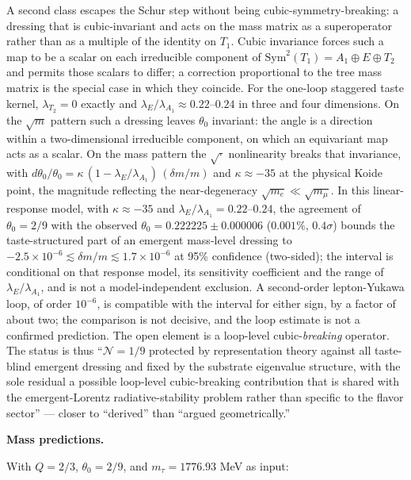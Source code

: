 \documentclass[
]{article}
\begin{document}
A second class escapes the Schur step without being
cubic-symmetry-breaking: a dressing that is cubic-invariant and acts on
the mass matrix as a superoperator rather than as a multiple of the
identity on \(T_1\). Cubic invariance forces such a map to be a scalar
on each irreducible component of
\(\mathrm{Sym}^2(T_1) = A_1 \oplus E \oplus T_2\) and permits those
scalars to differ; a correction proportional to the tree mass matrix is
the special case in which they coincide. For the one-loop staggered
taste kernel, \(\lambda_{T_2} = 0\) exactly and
\(\lambda_E/\lambda_{A_1} \approx 0.22\)--\(0.24\) in three and four
dimensions. On the \(\sqrt{m}\) pattern such a dressing leaves
\(\theta_0\) invariant: the angle is a direction within a
two-dimensional irreducible component, on which an equivariant map acts
as a scalar. On the mass pattern the \(\sqrt{\cdot}\) nonlinearity
breaks that invariance, with
\(d\theta_0/\theta_0 = \kappa\,(1 - \lambda_E/\lambda_{A_1})\,(\delta m/m)\)
and \(\kappa \approx -35\) at the physical Koide point, the magnitude
reflecting the near-degeneracy \(\sqrt{m_e} \ll \sqrt{m_\mu}\). In this
linear-response model, with \(\kappa \approx -35\) and
\(\lambda_E/\lambda_{A_1} = 0.22\)--\(0.24\), the agreement of
\(\theta_0 = 2/9\) with the observed
\(\theta_0 = 0.222225 \pm 0.000006\) (\(0.001\%\), \(0.4\sigma\)) bounds
the taste-structured part of an emergent mass-level dressing to
\(-2.5 \times 10^{-6} \lesssim \delta m/m \lesssim 1.7 \times 10^{-6}\)
at 95\% confidence (two-sided); the interval is conditional on that
response model, its sensitivity coefficient and the range of
\(\lambda_E/\lambda_{A_1}\), and is not a model-independent exclusion. A
second-order lepton-Yukawa loop, of order \(10^{-6}\), is compatible
with the interval for either sign, by a factor of about two; the
comparison is not decisive, and the loop estimate is not a confirmed
prediction. The open element is a loop-level cubic-\emph{breaking}
operator. The status is thus ``\(\mathcal{N} = 1/9\) protected by
representation theory against all taste-blind emergent dressing and
fixed by the substrate eigenvalue structure, with the sole residual a
possible loop-level cubic-breaking contribution that is shared with the
emergent-Lorentz radiative-stability problem rather than specific to the
flavor sector'' --- closer to ``derived'' than ``argued geometrically.''

\textbf{Mass predictions.}

With \(Q = 2/3\), \(\theta_0 = 2/9\), and \(m_\tau = 1776.93\) MeV as
input:
\end{document}
